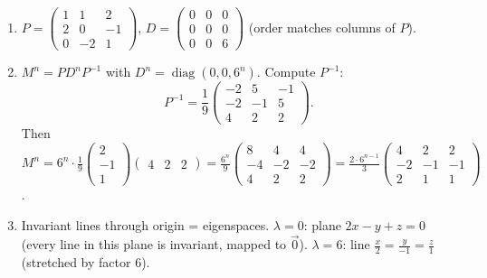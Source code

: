 \documentclass[11pt]{article}
\begin{document}
\begin{exoresolu}
\begin{enumerate}
\textbf{For $\lambda=6$:} Solve $(M-6I)\vec{x}=\vec{0}$:
\[
\begin{pmatrix} -2 & -2 & 2 \\ -2 & -5 & -1 \\ 2 & -1 & -5 \end{pmatrix}\sim\begin{pmatrix} 1 & 1 & -1 \\ 0 & -3 & -3 \\ 0 & 0 & 0 \end{pmatrix}\implies x+y-z=0,\ y+z=0.
\]
Solution: $y=-z$, $x=2z$. $E_6=\operatorname{span}\{(2,-1,1)\}$.

\item $P=\begin{pmatrix} 1 & 1 & 2 \\ 2 & 0 & -1 \\ 0 & -2 & 1 \end{pmatrix}$, $D=\begin{pmatrix} 0 & 0 & 0 \\ 0 & 0 & 0 \\ 0 & 0 & 6 \end{pmatrix}$ (order matches columns of $P$).

\item $M^n=PD^nP^{-1}$ with $D^n=\operatorname{diag}(0,0,6^n)$. Compute $P^{-1}$:
\[
P^{-1}=\frac{1}{9}\begin{pmatrix} -2 & 5 & -1 \\ -2 & -1 & 5 \\ 4 & 2 & 2 \end{pmatrix}.
\]
Then $M^n=6^n\cdot\frac{1}{9}\begin{pmatrix} 2 \\ -1 \\ 1 \end{pmatrix}\begin{pmatrix} 4 & 2 & 2 \end{pmatrix}=\frac{6^n}{9}\begin{pmatrix} 8 & 4 & 4 \\ -4 & -2 & -2 \\ 4 & 2 & 2 \end{pmatrix}=\frac{2\cdot6^{n-1}}{3}\begin{pmatrix} 4 & 2 & 2 \\ -2 & -1 & -1 \\ 2 & 1 & 1 \end{pmatrix}$.

\item Invariant lines through origin = eigenspaces.
$\lambda=0$: plane $2x-y+z=0$ (every line in this plane is invariant, mapped to $\vec{0}$).
$\lambda=6$: line $\frac{x}{2}=\frac{y}{-1}=\frac{z}{1}$ (stretched by factor $6$).
\end{enumerate}
\end{exoresolu}
\end{document}
